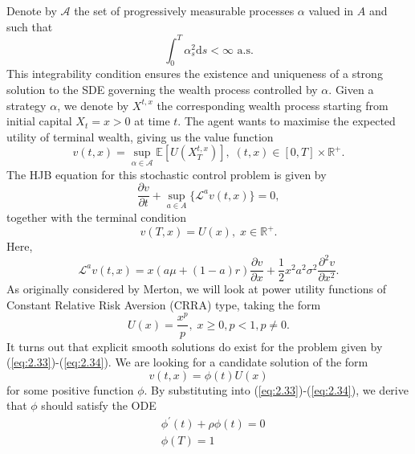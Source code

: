 Denote by $\mathcal{A}$ the set of progressively measurable processes $\alpha$ 
valued in $A$ and such that 
\begin{equation*}
    \int_0^T\alpha_s^2\mathrm ds<\infty\textrm{ a.s.}
\end{equation*}
This integrability condition ensures the existence and uniqueness of a strong solution
to the SDE governing the wealth process controlled by $\alpha$. Given a strategy $\alpha$,
we denote by $X^{t,x}$ the corresponding wealth process starting from initial capital
$X_t=x>0$ at time $t$. The agent wants to maximise the expected utility of terminal wealth,
giving us the value function 
\begin{equation}
    v(t,x)=\sup_{\alpha\in\mathcal{A}}\mathbb{E}[U(X_T^{t,x})],\;(t,x)\in[0,T]\times\mathbb{R}^+.
\end{equation}
The HJB equation for this stochastic control problem is given by 
\begin{equation}\label{eq:2.33}
    \frac{\partial v}{\partial t}+\sup_{a\in A}\{\mathcal{L}^av(t,x)\}=0,
\end{equation}
together with the terminal condition
\begin{equation}\label{eq:2.34}
    v(T,x)=U(x),\;x\in\mathbb{R}^+.
\end{equation}
Here, 
\begin{equation}\label{eq:2.35}
    \mathcal{L}^av(t,x)=x(a\mu+(1-a)r)\frac{\partial v}{\partial x}+\frac{1}{2}x^2a^2\sigma^2\frac{\partial^2 v}{\partial x^2}.
\end{equation}
As originally considered by Merton, we will look at power utility functions of 
Constant Relative Risk Aversion (CRRA) type, taking the form
\begin{equation*}
    U(x)=\frac{x^p}{p},\;x\geq0,p<1,p\neq0.
\end{equation*}
It turns out that explicit smooth solutions do exist for the problem given by 
(\ref{eq:2.33})-(\ref{eq:2.34}). We are looking for a candidate solution of the 
form 
\begin{equation*}
    v(t,x)=\phi(t)U(x)
\end{equation*}
for some positive function $\phi$. By substituting into (\ref{eq:2.33})-(\ref{eq:2.34}),
we derive that $\phi$ should satisfy the ODE
\begin{equation}
    \begin{aligned}
        &\phi^\prime(t)+\rho\phi(t)=0\\
        &\phi(T)=1
    \end{aligned}
\end{equation}
